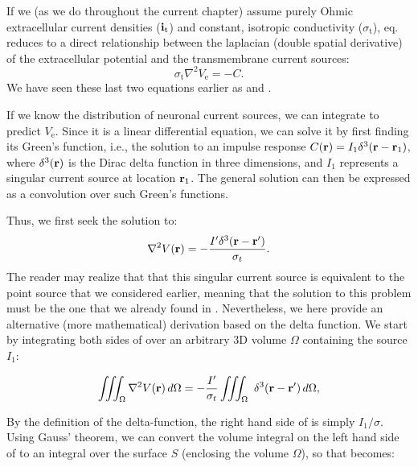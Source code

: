 If we (as we do throughout the current chapter) assume purely Ohmic extracellular current densities (${\bf i}_\mathrm{t}$) and constant, isotropic conductivity ($\sigma_\mathrm{t}$), eq.  reduces to a direct relationship between the laplacian (double spatial derivative) of the extracellular potential and the transmembrane current sources: 
\begin{equation}
\sigma_\text{t} \nabla^2{V_\mathrm{e}} = -C.
\label{eq:VC:CSD3}
\end{equation}
We have seen these last two equations earlier as  and .

If we know the distribution of neuronal current sources, we can integrate  to predict $V_\mathrm{e}$. 
Since it is a linear differential equation, we can solve it by first finding its Green's function, i.e., the solution to an impulse response $C({\bf r}) = I_1 \delta^3({\bf r}-{\bf r}_1)$, where $\delta^3({\bf r})$ is the Dirac delta function in three dimensions, and $I_1$ represents a singular current source at location ${\bf r}_1$. The general solution can then be expressed as a convolution over such Green's functions. 

Thus, we first seek the solution to:
\begin{equation}
\nabla^2 V({\bf r}) = - \frac{I' \delta^3({\bf r-r'})}{\sigma_t}.
\label{eq:VC:CSD5}
\end{equation}
The reader may realize that that this singular current source is equivalent to the point source that we considered earlier, meaning that the solution to this problem must be the one that we already found in . Nevertheless, we here provide an alternative (more mathematical) derivation based on the delta function. We start by integrating both sides of  over an arbitrary 3D volume $\Omega$ containing the source $I_1$:

\begin{equation}
\iiint_{\Omega} \nabla^2V({\bf r}) \,d\Omega =  - \frac{I'}{\sigma_t} \iiint_\Omega \ \delta^3({\bf r-r'}) \, d\Omega,
\label{eq:VC:marit}
\end{equation}

By the definition of the delta-function, the right hand side of  is simply $I_1/\sigma$. Using Gauss' theorem, we can convert the volume integral on the left hand side of  to an integral over the surface $S$ (enclosing the volume $\Omega$), so that  becomes:

